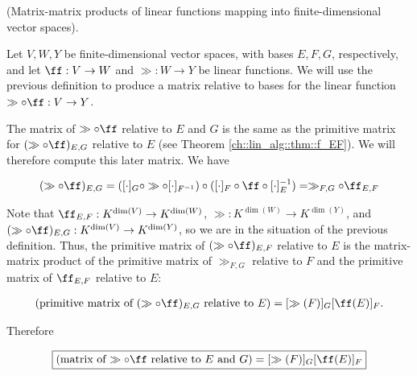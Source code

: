 \begin{theorem}
\label{ch::lin_alg::thm::matrix_matrix_product_relative_to_bases}

    (Matrix-matrix products of linear functions mapping into finite-dimensional vector spaces). 
    
    Let $V, W, Y$ be finite-dimensional vector spaces, with bases $E, F, G$, respectively, and let $\ff:V \rightarrow W$ and $\gg:W \rightarrow Y$ be linear functions. We will use the previous definition to produce a matrix relative to bases for the linear function $\gg \circ \ff:V \rightarrow Y$.
    
    The matrix of $\gg \circ \ff$ relative to $E$ and $G$ is the same as the primitive matrix for $(\gg \circ \ff)_{E,G}$ relative to $E$ (see Theorem \ref{ch::lin_alg::thm::f_EF}). We will therefore compute this later matrix. We have
    
    \begin{align*}
        (\gg \circ \ff)_{E,G} = ([\cdot]_G \circ \gg \circ [\cdot]_{F^{-1}}) \circ ([\cdot]_F \circ \ff \circ [\cdot]_E^{-1}) = \gg_{F,G} \circ \ff_{E,F}
    \end{align*}
    
    Note that $\ff_{E,F}:K^{\dim(V)} \rightarrow K^{\dim(W)}$, $\gg:K^{\dim(W)} \rightarrow K^{\dim(Y)}$, and $(\gg \circ \ff)_{E,G}:K^{\dim(V)} \rightarrow K^{\dim(Y)}$, so we are in the situation of the previous definition. Thus, the primitive matrix of $(\gg \circ \ff)_{E,F}$ relative to $E$ is the matrix-matrix product of the primitive matrix of $\gg_{F,G}$ relative to $F$ and the primitive matrix of $\ff_{E,F}$ relative to $E$:
    
    \begin{align*}
        (\text{primitive matrix of $(\gg \circ \ff)_{E,G}$ relative to $E$}) =  [\gg(F)]_G [\ff(E)]_F.
    \end{align*}
    
    Therefore
    
    \begin{align*}
        \boxed
        {
            (\text{matrix of $\gg \circ \ff$ relative to $E$ and $G$}) = [\gg(F)]_G [\ff(E)]_F
        }
    \end{align*}
\end{theorem}

